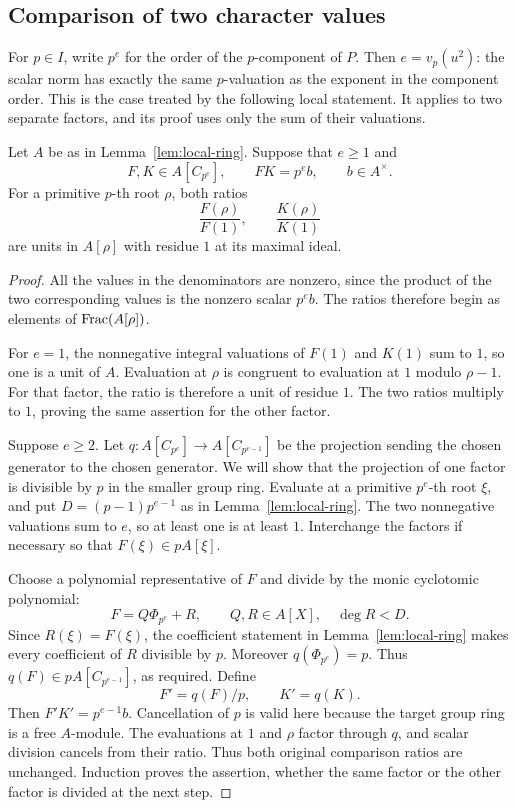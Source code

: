 \subsection{Comparison of two character values}

For \(p\in I\), write \(p^e\) for the order of the \(p\)-component
of \(P\). Then
\(e=v_p(u^2)\): the scalar norm has exactly the same \(p\)-valuation
as the exponent in the component order. This is the case treated
by the following local statement. It applies to two separate factors,
and its proof uses only the sum of their valuations.

\begin{lemma}\label{lem:comparison}
Let \(A\) be as in Lemma~\ref{lem:local-ring}. Suppose that \(e\geq1\)
and
\[
 F,K\in A[C_{p^e}],\qquad FK=p^e b,\qquad b\in A^\times.
\]
For a primitive \(p\)-th root \(\rho\), both ratios
\[
 \frac{F(\rho)}{F(1)},\qquad \frac{K(\rho)}{K(1)}
\]
are units in \(A[\rho]\) with residue \(1\) at its maximal ideal.
\end{lemma}

\begin{proof}
All the values in the denominators are nonzero, since the product
of the two corresponding values is the nonzero scalar \(p^e b\).
The ratios therefore begin as elements of \(\operatorname{Frac}(A[\rho])\).

For \(e=1\), the nonnegative integral valuations of \(F(1)\) and
\(K(1)\) sum to \(1\), so one is a unit of \(A\). Evaluation at
\(\rho\) is congruent to evaluation at \(1\) modulo \(\rho-1\).
For that factor, the ratio is therefore a unit of residue \(1\).
The two ratios multiply to \(1\), proving the same assertion for
the other factor.

Suppose \(e\geq2\). Let
\(q:A[C_{p^e}]\to A[C_{p^{e-1}}]\) be the projection sending the
chosen generator to the chosen generator. We will show that the
projection of one factor is divisible by \(p\) in the smaller group
ring. Evaluate at a primitive \(p^e\)-th root \(\xi\), and put
\(D=(p-1)p^{e-1}\) as in Lemma~\ref{lem:local-ring}. The two
nonnegative valuations sum to \(e\), so at least one is at least \(1\).
Interchange the factors if necessary so that
\(F(\xi)\in pA[\xi]\).

Choose a polynomial representative of \(F\) and divide by the monic
cyclotomic polynomial:
\[
 F=Q\Phi_{p^e}+R,\qquad Q,R\in A[X],\quad \deg R<D.
\]
Since \(R(\xi)=F(\xi)\), the coefficient statement in
Lemma~\ref{lem:local-ring} makes every coefficient of \(R\) divisible
by \(p\). Moreover \(q(\Phi_{p^e})=p\). Thus
\(q(F)\in pA[C_{p^{e-1}}]\), as required. Define
\[
 F'=q(F)/p,\qquad K'=q(K).
\]
Then \(F'K'=p^{e-1}b\). Cancellation of \(p\) is valid here because
the target group ring is a free \(A\)-module. The evaluations at
\(1\) and \(\rho\) factor through \(q\), and scalar division cancels
from their ratio. Thus both original comparison ratios are unchanged.
Induction proves the assertion, whether the same factor or the other
factor is divided at the next step.
\end{proof}

